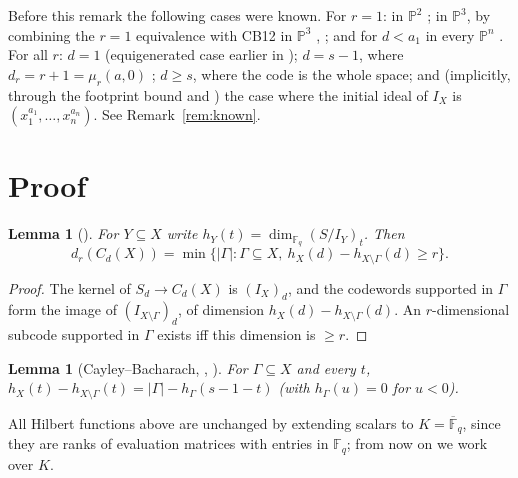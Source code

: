 \documentclass[11pt]{amsart}
\newtheorem{lemma}[theorem]{Lemma}
\theoremstyle{remark}
\theoremstyle{definition}
\newcommand{\F}{\mathbb F}
\newcommand{\Fb}{\overline{\mathbb F}_q}
\begin{document}
Before this remark the following cases were known. For $r=1$: in $\mathbb P^2$ \cite{CMSS,GLS}; in
$\mathbb P^3$, by combining the $r=1$ equivalence \cite[Prop.~6.8]{CSTPV} with CB12 in $\mathbb P^3$
\cite[Cor.~4.4]{GK13}, \cite[Cor.~A]{CavigliaDeStefani}; and for $d<a_1$ in every $\mathbb P^n$
\cite[Thm.~2.3]{CMSS}. For all $r$: $d=1$ \cite[Thm.~2.5]{CMSS} (equigenerated case earlier in
\cite[Cor.~6.6]{CSTPV}); $d=s-1$, where $d_r=r+1=\mu_r(a,0)$ \cite[Prop.~9]{GCSV}; $d\ge s$, where the code is
the whole space; and (implicitly, through the footprint bound \cite[Thm.~4.9]{GSMBVV} and
\cite{BeelenDatta}) the case where the initial ideal of $I_X$ is $(x_1^{a_1},\dots,x_n^{a_n})$. See
Remark~\ref{rem:known}.

\section{Proof}

\begin{lemma}[{\cite[Thm.~4.5]{GSMBVV}}]\label{lem:dr}
For $Y\subseteq X$ write $h_Y(t)=\dim_{\F_q}(S/I_Y)_t$. Then
\[
 d_r(C_d(X))=\min\{|\Gamma| : \Gamma\subseteq X,\ h_X(d)-h_{X\setminus\Gamma}(d)\ge r\}.
\]
\end{lemma}
\begin{proof}
The kernel of $S_d\to C_d(X)$ is $(I_X)_d$, and the codewords supported in $\Gamma$ form the image of
$(I_{X\setminus\Gamma})_d$, of dimension $h_X(d)-h_{X\setminus\Gamma}(d)$. An $r$-dimensional subcode
supported in $\Gamma$ exists iff this dimension is $\ge r$.
\end{proof}

\begin{lemma}[Cayley--Bacharach, {\cite{DGO}, \cite[CB7]{EGH96}}]\label{lem:cb}
For $\Gamma\subseteq X$ and every $t$,
$h_X(t)-h_{X\setminus\Gamma}(t)=|\Gamma|-h_\Gamma(s-1-t)$ (with $h_\Gamma(u)=0$ for $u<0$).
\end{lemma}

All Hilbert functions above are unchanged by extending scalars to $K=\Fb$, since they are ranks of
evaluation matrices with entries in $\F_q$; from now on we work over $K$.
\end{document}
